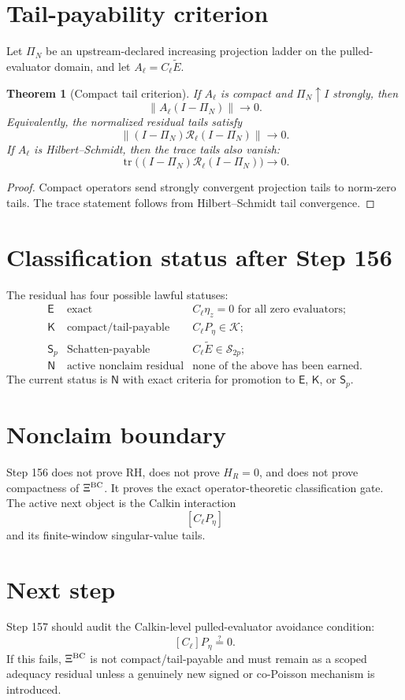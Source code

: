 \documentclass[11pt]{article}
\newtheorem{theorem}{Theorem}
\begin{document}
\section{Tail-payability criterion}
Let $\Pi_N$ be an upstream-declared increasing projection ladder on the pulled-evaluator domain, and let $A_\ell=C_\ell\widetilde E$.

\begin{theorem}[Compact tail criterion]
If $A_\ell$ is compact and $\Pi_N\uparrow I$ strongly, then
\[
        \|A_\ell(I-\Pi_N)\|\to0.
\]
Equivalently, the normalized residual tails satisfy
\[
        \|(I-\Pi_N)\mathcal R_\ell(I-\Pi_N)\|\to0.
\]
If $A_\ell$ is Hilbert--Schmidt, then the trace tails also vanish:
\[
        \operatorname{tr}\big((I-\Pi_N)\mathcal R_\ell(I-\Pi_N)\big)\to0.
\]
\end{theorem}

\begin{proof}
Compact operators send strongly convergent projection tails to norm-zero tails.  The trace statement follows from Hilbert--Schmidt tail convergence.
\end{proof}

\section{Classification status after Step 156}
The residual has four possible lawful statuses:
\[
\begin{array}{lll}
\mathsf E & \text{exact} & C_\ell\eta_z=0\text{ for all zero evaluators};\\
\mathsf K & \text{compact/tail-payable} & C_\ell P_\eta\in\mathcal K;\\
\mathsf S_p & \text{Schatten-payable} & C_\ell\widetilde E\in\mathcal S_{2p};\\
\mathsf N & \text{active nonclaim residual} & \text{none of the above has been earned.}
\end{array}
\]
The current status is $\mathsf N$ with exact criteria for promotion to $\mathsf E$, $\mathsf K$, or $\mathsf S_p$.

\section{Nonclaim boundary}
Step 156 does not prove RH, does not prove $H_R=0$, and does not prove compactness of $\Xi^{\rm BC}$.  It proves the exact operator-theoretic classification gate.  The active next object is the Calkin interaction
\[
        \boxed{[C_\ell P_\eta]}
\]
and its finite-window singular-value tails.

\section{Next step}
Step 157 should audit the Calkin-level pulled-evaluator avoidance condition:
\[
        [C_\ell]P_\eta\stackrel{?}{=}0.
\]
If this fails, $\Xi^{\rm BC}$ is not compact/tail-payable and must remain as a scoped adequacy residual unless a genuinely new signed or co-Poisson mechanism is introduced.
\end{document}

